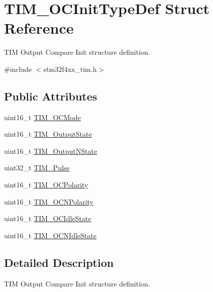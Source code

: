 \hypertarget{struct_t_i_m___o_c_init_type_def}{}\section{T\+I\+M\+\_\+\+O\+C\+Init\+Type\+Def Struct Reference}
\label{struct_t_i_m___o_c_init_type_def}


T\+IM Output Compare Init structure definition.  




{\ttfamily \#include $<$stm32f4xx\+\_\+tim.\+h$>$}

\subsection*{Public Attributes}
\begin{DoxyCompactItemize}
\item 
uint16\+\_\+t \hyperlink{struct_t_i_m___o_c_init_type_def_ad4338ed2415b0d6d19589bf72b7ba3b0}{T\+I\+M\+\_\+\+O\+C\+Mode}
\item 
uint16\+\_\+t \hyperlink{struct_t_i_m___o_c_init_type_def_a2baca9c02d214d3125635a74e8d9aee4}{T\+I\+M\+\_\+\+Output\+State}
\item 
uint16\+\_\+t \hyperlink{struct_t_i_m___o_c_init_type_def_a933904d2f892d0b945a908b9257fe869}{T\+I\+M\+\_\+\+Output\+N\+State}
\item 
uint32\+\_\+t \hyperlink{struct_t_i_m___o_c_init_type_def_ab4a2620c38029b136be560041173375d}{T\+I\+M\+\_\+\+Pulse}
\item 
uint16\+\_\+t \hyperlink{struct_t_i_m___o_c_init_type_def_a9ed3e2de4700d008729a916d8ba78486}{T\+I\+M\+\_\+\+O\+C\+Polarity}
\item 
uint16\+\_\+t \hyperlink{struct_t_i_m___o_c_init_type_def_a3e47e672810747302c9d0626ae2ccb17}{T\+I\+M\+\_\+\+O\+C\+N\+Polarity}
\item 
uint16\+\_\+t \hyperlink{struct_t_i_m___o_c_init_type_def_a2a28f2d62339e06caef12816e04a8f55}{T\+I\+M\+\_\+\+O\+C\+Idle\+State}
\item 
uint16\+\_\+t \hyperlink{struct_t_i_m___o_c_init_type_def_a6cbbe6eb87c2ab49e4d68fa9703ce949}{T\+I\+M\+\_\+\+O\+C\+N\+Idle\+State}
\end{DoxyCompactItemize}


\subsection{Detailed Description}
T\+IM Output Compare Init structure definition. 

